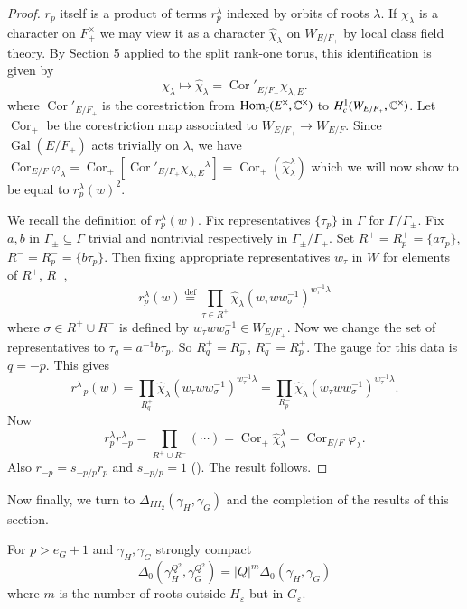 \documentclass{amsart}
\newenvironment{cthm}[1]
  {\renewcommand\thethm{\bf #1}\thm}
  {\endthm}
\def\Gal{\operatorname{\text{Gal}}}          %
\def\Hom{\operatorname{Hom}}         %
\def\Def{\overset{\operatorname{def}}=}   %
\def\varep{\varepsilon}
\def\LANGLANDSO{21}
\begin{document}
\begin{proof}  $r_p$ itself is a product of terms $r_p^\lambda$ indexed by orbits
of roots $\lambda$. 
If $\chi_\lambda$ is a character on $F_+^\times$ we may view it as
a character $\widehat \chi_\lambda$ on $W_{E/F_+}$ by local
class field theory. By Section 5 applied to the split rank-one torus, 
this identification is given by
$$
\chi_\lambda\mapsto \widehat\chi_\lambda =\operatorname{Cor}'_{E/F_+}\chi_{\lambda,E}.
$$
where $\operatorname{Cor}'_{E/F_+}$ is the corestriction from $\Hom_c(E^\times,\Bbb C^\times)$ to 
$H^1_c(W_{E/F_+},\Bbb C^\times)$.  Let $\operatorname{Cor}_+$ be the corestriction
map associated to $W_{E/F_+}\to W_{E/F}$. 
Since $\Gal(E/F_+)$ acts trivially on $\lambda$,
we have
$\operatorname{Cor}_{E/F}\varphi_\lambda
=\operatorname{Cor}_{+}\left[
\operatorname{Cor}'_{E/F_+}{\chi_{\lambda,E}}^\lambda\right]
=\operatorname{Cor}_{+}(\widehat\chi_\lambda^\lambda)$
which we will now show to be equal to $r_p^{\lambda}(w)^2$. 

We recall
the definition of $r_p^{\lambda}(w)$.
Fix representatives $\{\tau_p\}$
in $\Gamma$ for $\Gamma/\Gamma_\pm$.  Fix 
$a,b$ in $\Gamma_{\pm}\subseteq\Gamma$ trivial and nontrivial
respectively in $\Gamma_\pm/\Gamma_+$.  Set 
$ R^+ = R^+_p=\{a\tau_p\}$, $R^- = R^-_p = \{b\tau_p\}$.
Then fixing appropriate representatives $w_\tau$ in $W$ for elements of $R^+$,
$R^-$,
$$
r_p^{\lambda}(w)\Def
\prod_{\tau\in R^+}\widehat\chi_\lambda(w_\tau ww_\sigma^{-1})^{
w_\tau^{-1}\lambda}
$$
where $\sigma\in R^+\cup R^-$ is defined by
$w_\tau ww_\sigma^{-1}\in W_{E/F_+}$.  Now we change 
the set
of representatives to $\tau_q=a^{-1}b\tau_p$.
So $R^+_q = R^-_p$, $R^-_q=R^+_p$.
The gauge for this data is $q= -p$.  This gives
$$
r_{-p}^{\lambda}(w) =\prod_{R^+_q}
\widehat\chi_\lambda(w_\tau ww_\sigma^{-1})^{
w_\tau^{-1}\lambda}
=\prod_{R^-_p}\widehat \chi_\lambda(
w_\tau ww_\sigma^{-1})^{w_\tau^{-1}\lambda}.
$$
Now
$$
r_p^{\lambda}r_{-p}^{\lambda}
=\prod_{R^+\cup R^-}(\cdots)
=\operatorname{Cor}_{+}\widehat\chi_\lambda^\lambda
=\operatorname{Cor}_{E/F}\varphi_\lambda.
$$
Also $r_{-p}=s_{-p/p}r_p$
and $s_{-p/p} = 1$ (\cite{\LANGLANDSO, 2.4}).
The result follows.
\end{proof}

Now finally, we turn to $\Delta_{III_2}(\gamma_H,\gamma_G)$
and the completion of the results of this section.

\begin{cthm}{Theorem 10.17}  For $p>e_G+1$ 
and $\gamma_H,\gamma_G$
strongly compact
$$
\Delta_0(\gamma_H^{Q^2},\gamma_G^{Q^2})
=|Q|^m\Delta_0(\gamma_H,\gamma_G)
$$
where $m$ is the number of roots outside $H_{\varep}$
but in $G_{\varep}$.
\end{cthm}
\end{document}
